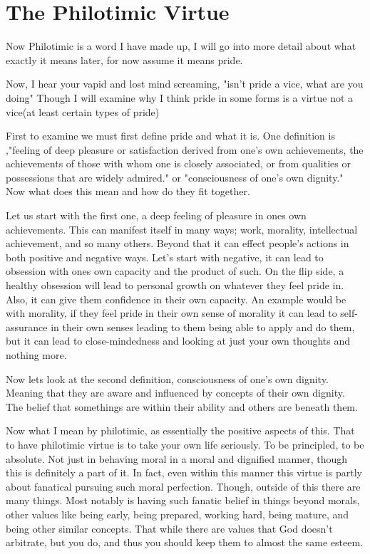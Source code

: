 \section{The Philotimic Virtue}
\par Now Philotimic is a word I have made up, I will go into more detail about what exactly it means later, for now assume it means pride.    
\par Now, I hear your vapid and lost mind screaming, "isn't pride a vice, what are you doing" Though I will examine why I think pride in some forms is a virtue not a vice(at least certain types of pride)
\par First to examine we must first define pride and what it is. One definition is ,"feeling of deep pleasure or satisfaction derived from one's own achievements, the achievements of those with whom one is closely associated, or from qualities or possessions that are widely admired." or "consciousness of one's own dignity." Now what does this mean and how do they fit together.
\par Let us start with the first one, a deep feeling of pleasure in ones own achievements. This can manifest itself in many ways; work, morality, intellectual achievement, and so many others. Beyond that it can effect people's actions in both positive and negative ways. Let's start with negative, it can lead to obsession with ones own capacity and the product of such. On the flip side, a healthy obsession will lead to personal growth on whatever they feel pride in. Also, it can give them confidence in their own capacity. An example would be with morality, if they feel pride in their own sense of morality it can lead to self-assurance in their own senses leading to them being able to apply and do them, but it can lead to close-mindedness and looking at just your own thoughts and nothing more.
\par Now lets look at the second definition, consciousness of one's own dignity. Meaning that they are aware and influenced by concepts of their own dignity. The belief that somethings are within their ability and others are beneath them.
\par Now what I mean by philotimic, as essentially the positive aspects of this. That to have philotimic virtue is to take your own life seriously. To be principled, to be absolute. Not just in behaving moral in a moral and dignified manner, though this is definitely a part of it. In fact, even within this manner this virtue is partly about fanatical pursuing such moral perfection. Though, outside of this there are many things. Most notably is having such fanatic belief in things beyond morals, other values like being early, being prepared, working hard, being mature, and being other similar concepts. That while there are values that God doesn't arbitrate, but you do, and thus you should keep them to almost the same esteem.
